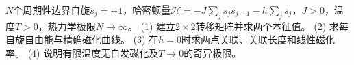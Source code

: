 \(N\)个周期性边界自旋\(s_j=\pm1\)，哈密顿量\(\mathcal H=-J\sum_js_js_{j+1}-h\sum_js_j\)，\(J>0\)，温度\(T>0\)，热力学极限\(N\to\infty\)。
(1) 建立\(2\times2\)转移矩阵并求两个本征值。
(2) 求每自旋自由能与精确磁化曲线。
(3) 在\(h=0\)时求两点关联、关联长度和线性磁化率。
(4) 说明有限温度无自发磁化及\(T\to0\)的奇异极限。
